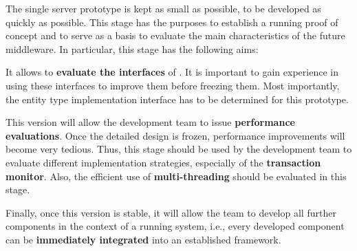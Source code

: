 \documentclass[a4paper, 10pt]{book}
\begin{document}
                                The single server prototype is kept as small as possible, to be
                                developed as quickly as possible. This stage has the purposes to
                                establish a running proof of concept and to serve as a basis to
                                evaluate the main characteristics of the future middleware. In
                                particular, this stage has the following aims:
                                \begin{description}
                                    \item It allows to \textbf{evaluate the interfaces} of \SYNEIGHT. It is
                                        important to gain experience in using these interfaces to improve
                                        them before freezing them. Most importantly, the entity type
                                        implementation interface has to be determined for this
                                        prototype. 
                                    \item This version will allow the development team to issue
                                        \textbf{performance evaluations}. Once the detailed design is
                                        frozen, performance improvements will become very tedious. Thus,
                                        this stage should be used by the development team to evaluate
                                        different implementation strategies, especially of the
                                        \textbf{transaction monitor}. Also, the efficient use of
                                        \textbf{multi-threading} should be evaluated in this stage.
                                    \item Finally, once this version is stable, it will allow the team to
                                        develop all further components in the context of a running system,
                                        i.e., every developed component can be \textbf{immediately
                                        integrated} into an established framework.
                                \end{description}
\end{document}
